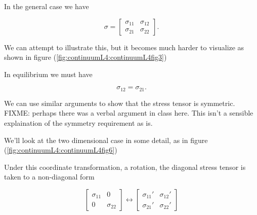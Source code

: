 In the general case we have

\begin{equation}\label{eqn:continuumL4:70}
\sigma = 
\begin{bmatrix}
\sigma_{11} & \sigma_{12} \\
\sigma_{21} & \sigma_{22}
\end{bmatrix}.
\end{equation}

We can attempt to illustrate this, but it becomes much harder to visualize as shown in figure (\ref{fig:continuumL4:continuumL4fig3})

In equilibrium we must have

\begin{equation}\label{eqn:continuumL4:90}
\sigma_{12} = \sigma_{21}.
\end{equation}

We can use similar arguments to show that the stress tensor is symmetric.
FIXME: perhaps there was a verbal argument in class here.  This isn't a sensible explaination of the symmetry requirement as is.

We'll look at the two dimensional case in some detail, as in figure (\ref{fig:continuumL4:continuumL4fig6})


Under this coordinate transformation, a rotation, the diagonal stress tensor is taken to a non-diagonal form 

\begin{equation}\label{eqn:continuumL4:130}
\begin{bmatrix}
\sigma_{11} & 0 \\
0 & \sigma_{22} 
\end{bmatrix}
\leftrightarrow
\begin{bmatrix}
\sigma_{11}' & \sigma_{12}' \\
\sigma_{21}' & \sigma_{22}' 
\end{bmatrix}
\end{equation}

